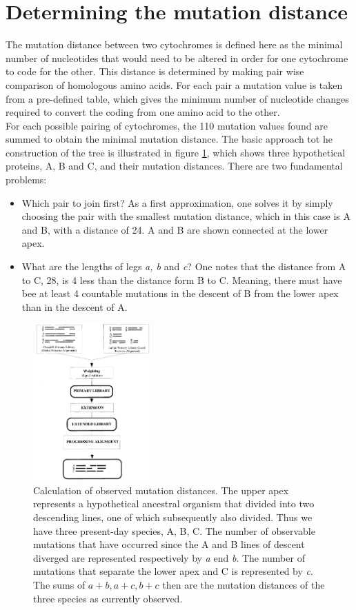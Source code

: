 \section{Determining the mutation distance}
The mutation distance between two cytochromes is defined here as the minimal number of nucleotides that would need to be altered in order for one cytochrome to code for the other. This distance is determined by making pair wise comparison of homologous amino acids. For each pair a mutation value is taken from a pre-defined table, which gives the minimum number of nucleotide changes required to convert the coding from one amino acid to the other.
\\
For each possible pairing of cytochromes, the 110 mutation values found are summed to obtain the minimal mutation distance.
The basic approach tot he construction of the tree is illustrated in figure \ref{fig:1}, which shows three hypothetical proteins, A, B and C, and their mutation distances. There are two fundamental problems:

\begin{itemize}
\item Which pair to join first? As a first approximation, one solves it by simply choosing the pair with the smallest mutation distance, which in this case is A and B, with a distance of 24. A and B are shown connected at the lower apex.
\item What are the lengths of legs \textit{a, b} and \textit{c}? One notes that the distance from A to C, 28, is 4 less than the distance form B to C. Meaning, there must have bee at least 4 countable mutations in the descent of B from the lower apex than in the descent of A.
\end{itemize}

\begin{figure}[H]
		\centering
		\includegraphics[width=0.4\textwidth]{1.png}
		\caption{Calculation of observed mutation distances. The upper apex represents a hypothetical ancestral organism that divided into two descending lines, one of which subsequently also divided. Thus we have three present-day species, A, B, C. The number of observable mutations that have occurred since the A and B lines of descent diverged are represented respectively by \textit{a} end \textit{b}. The number of mutations that separate the lower apex and C is represented by \textit{c}. The sums of $a+b, a+c, b+c$ then are the mutation distances of the three species as currently observed.}
		\label{fig:1}
	\end{figure}


